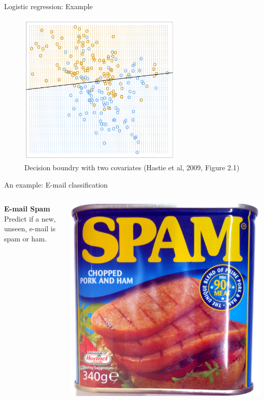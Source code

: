\documentclass[10pt]{beamer}
\begin{document}
\begin{frame}{Logistic regression: Example}


\begin{figure}[h]
\caption{Decision boundry with two covariates (Hastie et al, 2009, Figure 2.1) }
\centering
\includegraphics[width=0.7\textwidth]{figs/decision_fig_2_1.png}
\end{figure}

\end{frame}




\begin{frame}{An example: E-mail classification}

\begin{columns}
	\begin{column}{0.47\textwidth}
		\textbf{E-mail Spam}\\
Predict if a new, unseen, e-mail is spam or ham.
	\end{column}
	\begin{column}{0.5\textwidth}
		\includegraphics[width=\textwidth]{figs/spam.jpg}
	\end{column}
\end{columns}
\end{frame}
\end{document}
